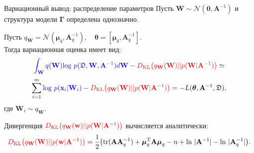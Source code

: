 \documentclass[usenames,dvipsnames,11pt,pdf,utf8,russian,aspectratio=169]{beamer}
\DeclareMathOperator*{\argmax}{arg\,max}
\begin{document}

    

\begin{frame}{Вариационный вывод: распределение параметров}
Пусть $\mathbf{W} \sim \mathcal{N}(\mathbf{0}, \mathbf{A}^{-1})$ и структура модели $\boldsymbol{\Gamma}$ определена однозначно.

Пусть $q_\mathbf{W} = \mathcal{N}(\boldsymbol{\mu}_q, \mathbf{A}^{-1}_q), \quad \boldsymbol{\theta} =  [\boldsymbol{\mu}_q, \mathbf{A}^{-1}_q].$ \\
Тогда вариационная оценка имеет вид:
$$
\textcolor{blue}{\int_{\mathbf{W}} q(\mathbf{W})\text{log}~{p(\mathfrak{D},\mathbf{W},\mathbf{A}^{-1})} d \mathbf{W}} - \textcolor{red}{D_\text{KL}\bigl(q_\mathbf{W} (\mathbf{W} )|| p (\mathbf{W}|\mathbf{A}^{-1})\bigr)} \simeq
$$
$$
\sum_{i=1}^m \textcolor{blue}{\text{log}~p(\mathbf{x}_i | \mathbf{W}_i)} - \textcolor{red}{D_\text{KL}\bigl(q_\mathbf{W} (\mathbf{W} )|| p (\mathbf{W}|\mathbf{A}^{-1})\bigr)} = -L(\boldsymbol{\theta}, \mathbf{A}^{-1}, \mathfrak{D}),
$$
где $\mathbf{W}_i \sim q_\mathbf{W}$.

Дивергенция $\textcolor{red}{D_\text{KL}\bigl(q_\mathbf{W} (\mathbf{w} )|| p (\mathbf{W}|\mathbf{A}^{-1})\bigr)}$ вычисляется аналитически:
$$
\textcolor{red}{D_\text{KL}\bigl(q_\mathbf{W} (\mathbf{W}) || p (\mathbf{w}|\mathbf{A}^{-1})\bigr)} = \frac{1}{2} \bigl( \text{tr} (\mathbf{A}\mathbf{A}^{-1}_q) + \boldsymbol{\mu}_q^\text{T}\mathbf{A}\boldsymbol{\mu}_q - n +\text{ln}~|\mathbf{A}^{-1}| - \text{ln}~|\mathbf{A}^{-1}_q| \bigr).
$$

\end{frame}
\end{document}
